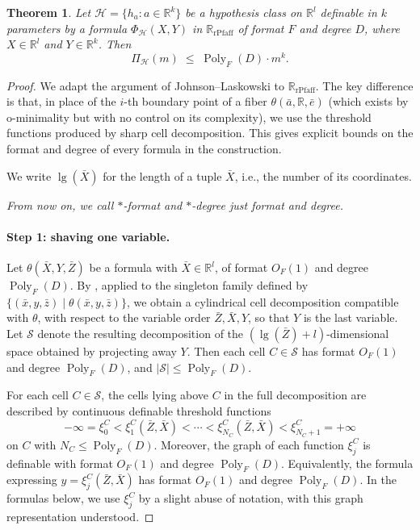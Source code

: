 \documentclass[11pt]{article}
\theoremstyle{plain}
\newtheorem{theorem}{Theorem}[section]
\theoremstyle{definition}
\theoremstyle{remark}
\newcommand{\R}{\mathbb{R}}
\newcommand{\cH}{\mathcal{H}}
\newcommand{\cS}{\mathcal{S}}
\newcommand{\Poly}{\operatorname{Poly}}
\newcommand{\rPfaff}{\operatorname{rPfaff}}
\begin{document}
\begin{theorem}
\label{thm:sharp-shatter}
Let $\cH = \{h_a : a \in \R^k\}$ be a hypothesis class on $\R^l$
definable in $k$ parameters by a formula $\Phi_\cH(X, Y)$ in $\R_{\rPfaff}$
of format $F$ and degree $D$, where $X \in \R^l$ and $Y \in \R^k$.
Then
\[
  \Pi_{\cH}(m) \;\le\; \Poly_F(D) \cdot m^k.
\]
\end{theorem}

\begin{proof}
We adapt the argument of Johnson--Laskowski \cite[Lemma 4.2 and Proposition 4.3]{LaskowskiCompression} to $\R_{\rPfaff}$. The key difference is that, in place of the $i$-th boundary point of a fiber $\theta(\bar a, \R, \bar e)$ (which exists by o-minimality but with no control on its complexity), we use the threshold functions produced by sharp cell decomposition. This gives explicit bounds on the format and degree of every formula in the construction.

We write $\lg(\bar X)$ for the length of a tuple $\bar X$, i.e., the number of its coordinates.

\emph{From now on, we call $*$-format and $*$-degree just format and degree.}


\paragraph{Step 1: shaving one variable.}

Let $\theta(\bar X, Y, \bar Z)$ be a formula with $\bar X \in \R^l$, of format $O_F(1)$ and degree $\Poly_F(D)$. By , applied to the singleton family defined by $\{(\bar x, y, \bar z) \mid \theta(\bar x, y, \bar z)\}$, we obtain a cylindrical cell decomposition compatible with $\theta$, with respect to the variable order $\bar Z, \bar X, Y$, so that $Y$ is the last variable. Let $\cS$ denote the resulting decomposition of the $(\lg(\bar Z) + l)$-dimensional space obtained by projecting away $Y$. Then each cell $C \in \cS$ has format $O_F(1)$ and degree $\Poly_F(D)$, and $|\cS| \le \Poly_F(D)$.


For each cell $C \in \cS$, the cells lying above $C$ in the full decomposition are described by continuous definable threshold functions
\[
  -\infty = \xi_0^C < \xi_1^C(\bar Z, \bar X) < \cdots < \xi_{N_C}^C(\bar Z, \bar X) < \xi_{N_C+1}^C = +\infty
\]
on $C$ with $N_C \le \Poly_F(D)$. Moreover, the graph of each function \(\xi_j^C\) is definable with format \(O_F(1)\) and degree \(\Poly_F(D)\). Equivalently, the formula expressing \( y=\xi_j^C(\bar Z,\bar X)\) has format \(O_F(1)\) and degree \(\Poly_F(D)\). In the formulas below, we use \(\xi_j^C\) by a slight abuse of notation, with this graph representation understood.


\end{proof}
\end{document}
